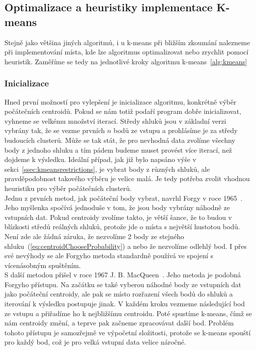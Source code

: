 \subsection{Optimalizace a heuristiky implementace K-means} \label{ssec:optimization}
Stejně jako většina jiných algoritmů, i u k-means při bližším zkoumání nalezneme při implementování místa, kde lze algoritmus optimalizovat nebo zrychlit pomocí heuristik.
Zaměříme se tedy na jednotlivé kroky algoritmu k-means~\ref{alg:kmeans}

\subsubsection{Inicializace}
Hned první možností pro vylepšení je inicializace algoritmu, konkrétně výběr počátečních centroidů. Pokud se nám totiž podaří program dobře inicializovat, vyhneme se velkému množství iterací. Středy shluků jsou v základní verzi vybrány tak, že se vezme prvních $n$ bodů ze vstupu a prohlásíme je za středy budoucích clusterů. Může se tak stát, že pro nevhodná data zvolíme všechny body z jednoho shluku a tím pádem budeme muset provést více iterací, než dojdeme k výsledku. Ideální případ, jak již bylo napsáno výše v sekci~\ref{ssec:kmeansrestrictions}, je vybrat body z různých shluků, ale pravděpodobnost takového výběru je velice malá. Je tedy potřeba zvolit vhodnou heuristiku pro výběr počátečních clusterů.\\%

Jednu z prvních metod, jak počáteční body vybrat, navrhl Forgy v roce 1965~\cite{Anderberg73}. Jeho myšlenka spočívá jednoduše v tom, že jsou body vybrány náhodně ze vstupních dat. Pokud centroidy zvolíme takto, je větší šance, že to budou v blízkosti středů reálných shluků, protože jde o místa s největší hustotou bodů. Není zde ale žádná záruka, že nezvolíme 2 body ze stejného shluku~(\autoref{eq:centroidChooseProbability}) a nebo že nezvolíme odlehlý bod. I přes své nevýhody se ale Forgyho metoda standardně používá ve spojení s vícenásobným spuštěním.\\

S další metodou přišel v roce 1967 J. B. MacQueen~\cite{MacQueen67}. Jeho metoda je podobná Forgyho přístupu. Na začátku se také vyberou náhodné body ze vstupních dat jako počáteční centroidy, ale pak se místo rozřazení všech bodů do shluků a iterování k výsledku postupuje jinak. V každém kroku vezmeme následující bod ze vstupu a přiřadíme ho k nejbližšímu centroidu. Poté spustíme k-means, čímž se nám centroidy změní, a teprve pak začneme zpracovávat další bod. Problém tohoto přístupu je samozřejmě ve výpočetní složitosti, protože se k-means spouští pro každý bod, což je pro velká vstupní data velice náročné.\\

